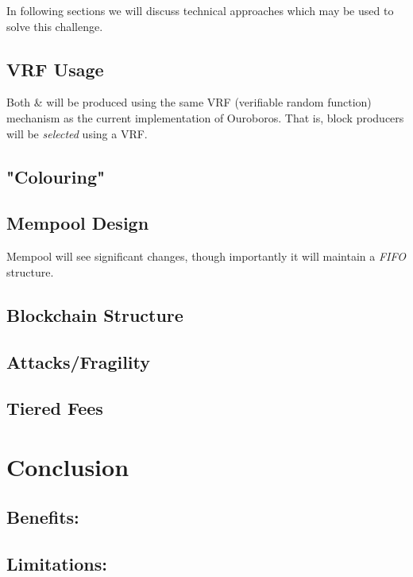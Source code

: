 \documentclass[11pt,a4paper]{article}
\begin{document}
In following sections we will discuss technical approaches which may be used to solve this challenge.

\subsection{VRF Usage}
Both  \&  will be produced using the same VRF (verifiable random function) mechanism 
as the current implementation of Ouroboros. That is, block producers will be \emph{selected} using a VRF. 



\subsection{"Colouring"}

\subsection{Mempool Design}
Mempool will see significant changes, though importantly it will maintain a \emph{FIFO} structure.

\subsection{Blockchain Structure}

\subsection{Attacks/Fragility}

\subsection{Tiered Fees}



\pagebreak


\section{Conclusion}

\subsection{Benefits:}
\subsection{Limitations:}


\pagebreak
\printglossaries
\end{document}
